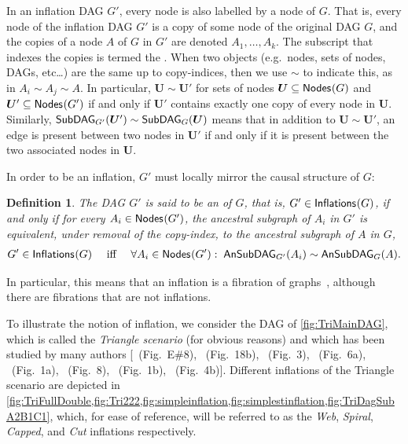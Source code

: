 \documentclass[aps,english,10pt,superscriptaddress,onecolumn,twoside,longbibliography,pra,floatfix,fleqn,nofootinbib]{revtex4-1}%
\newcommand*{\tblue}[1]{{\color{MidnightBlue}{\textbf{#1}}}}
\newtheorem{definition}[theorem]{Definition}
\theoremstyle{definition}
\newcommand{\SmallNamedFunction}[3][]{\operatorname{\mathsf{#2}}_{#1}\parenths{#3}}
\newcommand{\subgraph}[2][]{\SmallNamedFunction[#1]{SubDAG}{#2}}
\newcommand{\ansubgraph}[2][]{\SmallNamedFunction[#1]{AnSubDAG}{#2}}
\newcommand{\nodes}[1]{\SmallNamedFunction{Nodes}{#1}}
\newcommand{\inflations}[1]{\SmallNamedFunction{Inflations}{#1}}
\DeclarePairedDelimiter{\parenths}{\lparen}{\rparen}
\begin{document}
In an inflation DAG $G'$, every node is also labelled by a node of $G$.   That is, every node of the inflation DAG $G'$ is a copy of some node of the original DAG $G$, and the copies of a node $A$ of $G$ in $G'$ are denoted $A_1,\ldots, A_k$. 
The subscript that indexes the copies is termed the \tblue{copy-index}.
When two objects (e.g.~nodes, sets of nodes, DAGs, etc\ldots) are the same up to copy-indices, then we use $\sim$ to indicate this, as in $A_i\sim A_j\sim A$. In particular, $\bm{U}\sim\bm{U}'$ for sets of nodes $\bm{U}\subseteq\nodes{G}$ and $\bm{U}'\subseteq\nodes{G'}$ if and only if $\bm{U}'$ contains exactly one copy of every node in $\bm{U}$. Similarly, $\subgraph[G']{\bm{U}'}\sim\subgraph[G]{\bm{U}}$ means that in addition to $\bm{U}\sim\bm{U}'$, an edge is present between two nodes in $\bm{U}'$ if and only if it is present between the two associated nodes in $\bm{U}$.

In order to be an inflation, $G'$ must locally mirror the causal structure of $G$:
\begin{definition}
	The DAG $G'$ is said to be an \tblue{inflation} of $G$, that is, $G' \in \inflations{G}$, if and only if for every $A_i\in\nodes{G'}$, the ancestral subgraph of $A_i$ in $G'$ is equivalent, under removal of the copy-index, to the ancestral subgraph of $A$ in $G$,
\begin{align}\label{eq:definflationDAG}
G' \in\inflations{G} \quad\text{ iff }\quad \forall A_i\in \nodes{G'}:\; \ansubgraph[G']{A_i}\sim\ansubgraph[G]{A}.
\end{align}
\end{definition}

In particular, this means that an inflation is a fibration of graphs~\cite{fibgraphs}, although there are fibrations that are not inflations.

To illustrate the notion of inflation, we consider the DAG of \cref{fig:TriMainDAG}, which is called the {\em Triangle scenario} (for obvious reasons) and which has been studied by many authors [\citealp{pusey2014gdag}~(Fig.~E\#8), \citealp{WoodSpekkens}~(Fig.~18b), \citealp{fritz2012bell}~(Fig.~3), \citealp{chaves2014novel}~(Fig.~6a), \citealp{Chaves2015infoquantum}~(Fig.~1a), \citealp{BilocalCorrelations}~(Fig.~8), \citealp{steudel2010ancestors}~(Fig.~1b), \citealp{chaves2014informationinference}~(Fig.~4b)].
Different inflations of the Triangle scenario are depicted in \cref{fig:TriFullDouble,fig:Tri222,fig:simpleinflation,fig:simplestinflation,fig:TriDagSubA2B1C1}, which, for ease of reference, will be referred to as the {\em Web}, {\em Spiral}, {\em Capped}, and {\em Cut} inflations respectively.
\end{document}
